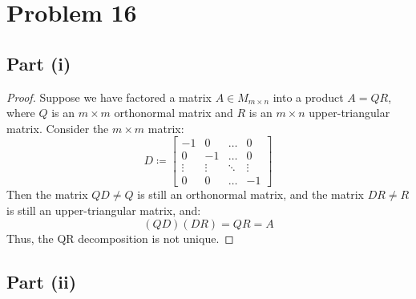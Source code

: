 \documentclass{article}
\begin{document}
\section*{Problem 16}

\subsection*{Part (i)}

\begin{proof}
Suppose we have factored a matrix $A \in M_{m \times n}$ into a product $A = QR$, where $Q$ is an $m \times m$ orthonormal matrix and $R$ is an $m \times n$ upper-triangular matrix. Consider the $m \times m$ matrix:
$$D \coloneqq \begin{bmatrix} -1 & 0 & \dots & 0 \\ 0 & -1 & \dots & 0 \\ \vdots & \vdots & \ddots & \vdots \\ 0 & 0 & \dots & -1 \end{bmatrix}$$
Then the matrix $QD \ne Q$ is still an orthonormal matrix, and the matrix $DR \ne R$ is still an upper-triangular matrix, and:
$$(QD)(DR)  = QR = A$$
Thus, the QR decomposition is not unique.
\end{proof}

\subsection*{Part (ii)}
\end{document}

